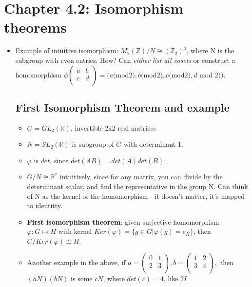 \documentclass[11pt, oneside]{article}   	%
\begin{document}
\section{Chapter 4.2: Isomorphism theorems}
\begin {itemize}
\item Example of intuitive isomorphism: $M_2(\mathbb{Z})/N \cong (\mathbb{Z}_2)^4$, where N is the subgroup with even entries.   How?  Can \emph{either list all cosets} or construct a homomorphism $\phi
   \begin{pmatrix}
    a     & b \\
   c     & d \\
  \end{pmatrix}
    = (a ($mod$2), b ($mod$2), c ($mod$2), d$ mod $ 2)).$

\subsection{First Isomorphism Theorem and example}
  \begin{itemize} 
  \item $G = GL_2(\mathbb{R})$, invertible 2x2 real matrices
  \item $N = SL_2(\mathbb{R})$ is subgroup of $G$ with determinant 1.
  \item $\varphi$ is $det$, since $det(AB) = det(A)det(B)$.
  \item $G / N \cong \mathbb{R}^*$ intuitively, since for any matrix, you can divide by the determinant scalar, and find the representative in the group N.   Can think of N as the kernel of the homomorphism - it doesn't matter, it's mapped to identitty.
  \item \textbf{First isomorphism theorem}: given surjective homomorphism $\varphi: G \mapsto H$ with kernel $Ker(\varphi) = \{g \in G |\varphi(g) = e_H\}$, then $G / Ker(\varphi) \cong H$. 
  \item Another example in the above, if 
    $a= \begin{pmatrix} 0 & 1 \\ 2 & 3 \\   \end{pmatrix},
     b= \begin{pmatrix} 1 & 2 \\ 3 & 4 \\   \end{pmatrix},$ then $(aN)(bN)$ is some $cN$, where $det(c) = 4$, like $2I$
  \end{itemize}
  \end{itemize}
\end{document}
